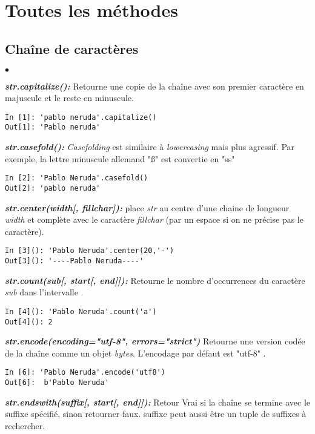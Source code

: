 \documentclass[10pt,dvipsnames,  dvips]{article}
\begin{document}
\newpage
\section{Toutes les méthodes}
\subsection{Chaîne de caractères}

\begin{list}{$\bullet$}{}
\item \textit{\textbf{str.capitalize(): }}  Retourne une copie de la chaîne avec son premier caractère en majuscule et le reste en minuscule.
\begin{lstlisting}
In [1]: 'pablo neruda'.capitalize()
Out[1]: 'Pablo neruda'
\end{lstlisting}
\item \textit{\textbf{str.casefold(): }} \textit{Casefolding} est similaire à \textit{lowercasing} mais plus agressif. Par exemple, la lettre minuscule allemand "ß" est convertie en "ss"
\begin{lstlisting}
In [2]: 'Pablo Neruda'.casefold()
Out[2]: 'pablo neruda'
\end{lstlisting}
\item \textit{\textbf{str.center(width[, fillchar]): }} place \textit{str} au centre d'une chaine de longueur \textit{width} et complète avec le caractère \textit{fillchar} (par un espace si on ne précise pas le caractère).
\begin{lstlisting}
In [3](): 'Pablo Neruda'.center(20,'-')
Out[3](): '----Pablo Neruda----'
\end{lstlisting}
\item \textit{\textbf{str.count(sub[, start[, end]]): }} Retourne le nombre d'occurrences du caractère \textit{sub} dans l'intervalle .
\begin{lstlisting}
In [4](): 'Pablo Neruda'.count('a')
Out[4](): 2
\end{lstlisting}
\item \textit{\textbf{str.encode(encoding="utf-8", errors="strict")}} Retourne une version codée de la chaîne comme un objet \textit{bytes}. L'encodage par défaut est "utf-8" .
\begin{lstlisting}
In [6]: 'Pablo Neruda'.encode('utf8')
Out[6]:  b'Pablo Neruda'
\end{lstlisting}
\item \textit{\textbf{ str.endswith(suffix[, start[, end]]): }}  Retour Vrai si la chaîne se termine avec le suffixe spécifié, sinon retourner faux. suffixe peut aussi être un tuple de suffixes à rechercher. %

\end{list}
\end{document}
